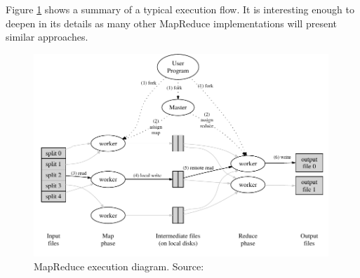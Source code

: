 Figure \ref{fig:exmapreduce} shows a summary of a typical execution flow. It is interesting enough to deepen in its details as many other MapReduce implementations will present similar approaches.

\begin{figure}[tbp]
\begin{center}
 \includegraphics[width=0.99\textwidth]{imagenes/006.pdf}
 \caption{MapReduce execution diagram. Source: \cite{googlemapreduce}}
 \label{fig:exmapreduce}
\end{center}
\end{figure}

